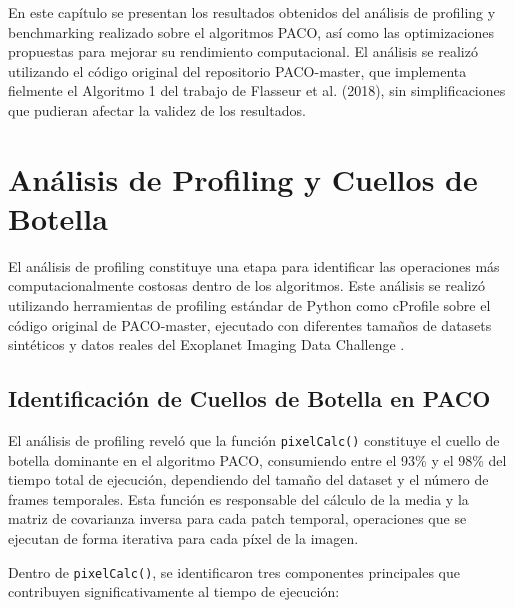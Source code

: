 En este capítulo se presentan los resultados obtenidos del análisis de profiling y benchmarking realizado sobre el algoritmos PACO, así como las optimizaciones propuestas para mejorar su rendimiento computacional. El análisis se realizó utilizando el código original del repositorio PACO-master, que implementa fielmente el Algoritmo 1 del trabajo de Flasseur et al. (2018), sin simplificaciones que pudieran afectar la validez de los resultados.

\section{Análisis de Profiling y Cuellos de Botella}

El análisis de profiling constituye una etapa para identificar las operaciones más computacionalmente  costosas dentro de los algoritmos. Este análisis se realizó utilizando herramientas de profiling estándar de Python como cProfile sobre el código original de PACO-master, ejecutado con diferentes tamaños de datasets sintéticos y datos reales del Exoplanet Imaging Data Challenge \cite{ExoplanetImagingChallenge}.

\subsection{Identificación de Cuellos de Botella en PACO}

El análisis de profiling reveló que la función \texttt{pixelCalc()} constituye el cuello de botella dominante en el algoritmo PACO, consumiendo entre el 93\% y el 98\% del tiempo total de ejecución, dependiendo del tamaño del dataset y el número de frames temporales. Esta función es responsable del cálculo de la media y la matriz de covarianza inversa para cada patch temporal, operaciones que se ejecutan de forma iterativa para cada píxel de la imagen.

Dentro de \texttt{pixelCalc()}, se identificaron tres componentes principales que contribuyen significativamente al tiempo de ejecución:

